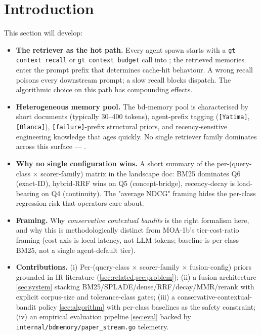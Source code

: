 \section{Introduction}
\label{sec:intro}


This section will develop:

\begin{itemize}[leftmargin=*]
  \item \textbf{The retriever as the hot path.} Every agent spawn starts
        with a \texttt{gt context recall} or \texttt{gt context budget}
        call into \bdmemory; the retrieved memories enter the prompt
        prefix that determines cache-hit behaviour. A wrong recall poisons
        every downstream prompt; a slow recall blocks dispatch. The
        algorithmic choice on this path has compounding effects.
  \item \textbf{Heterogeneous memory pool.} The bd-memory pool is
        characterised by short documents (typically 30--400 tokens),
        agent-prefix tagging (\texttt{[Yatima]}, \texttt{[Blanca]}),
        \texttt{[failure]}-prefix structural priors, and recency-sensitive
        engineering knowledge that ages quickly. No single retriever
        family dominates across this surface --- .
  \item \textbf{Why no single configuration wins.} A short summary of
        the per-(query-class $\times$ scorer-family) matrix in the
        landscape doc: BM25 dominates Q6 (exact-ID), hybrid-RRF wins on
        Q5 (concept-bridge), recency-decay is load-bearing on Q4
        (continuity). The "average NDCG" framing hides the per-class
        regression risk that operators care about.
  \item \textbf{Framing.} Why \emph{conservative contextual bandits}
        \cite{wu2016conservative,kazerouni2017conservative} is the right
        formalism here, and why this is methodologically distinct from
        MOA-1b's tier-cost-ratio framing (cost axis is local latency,
        not LLM tokens; baseline is per-class BM25, not a single
        agent-default tier).
  \item \textbf{Contributions.} (i) Per-(query-class $\times$ scorer-family
        $\times$ fusion-config) priors grounded in IR literature
        (\cref{sec:related,sec:problem}); (ii) a fusion architecture
        \cref{sec:system} stacking BM25/SPLADE/dense/RRF/decay/MMR/rerank
        with explicit corpus-size and tolerance-class gates; (iii) a
        conservative-contextual-bandit policy \cref{sec:algorithm}
        with per-class baselines as the safety constraint; (iv) an
        empirical evaluation pipeline \cref{sec:eval} backed by
        \texttt{internal/bdmemory/paper\_stream.go} telemetry.
\end{itemize}
